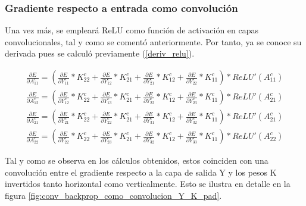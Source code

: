 \subsubsection{Gradiente respecto a entrada como convolución}

Una vez más, se empleará ReLU como función de activación en capas convolucionales, tal y como se comentó anteriormente. Por tanto, ya se conoce su derivada pues se calculó previamente (\ref{deriv_relu}).


\begin{gather}
	\frac{\partial E}{\partial A^c_{11}} = (\frac{\partial E}{\partial Y^c_{11}} * K^c_{22} + \frac{\partial E}{\partial Y^c_{12}} * K^c_{21} + \frac{\partial E}{\partial Y^c_{21}} * K^c_{12} + \frac{\partial E}{\partial Y^c_{22}} * K^c_{11}) *  ReLU'(A^c_{11}) \\
	\frac{\partial E}{\partial A^c_{12}} = (\frac{\partial E}{\partial Y^c_{12}} * K^c_{22} + \frac{\partial E}{\partial Y^c_{13}} * K^c_{21} + \frac{\partial E}{\partial Y^c_{22}} * K^c_{12} + \frac{\partial E}{\partial Y^c_{23}} * K^c_{11}) * ReLU'(A^c_{21}) \\
	\frac{\partial E}{\partial A^c_{21}} = (\frac{\partial E}{\partial Y^c_{21}} * K^c_{22} + \frac{\partial E}{\partial Y^c_{22}} * K^c_{21} + \frac{\partial E}{\partial Y^c_{31}} * K^c_{12} + \frac{\partial E}{\partial Y^c_{32}} * K^c_{11}) * ReLU'(A^c_{21}) \\
	\frac{\partial E}{\partial A^c_{22}} = (\frac{\partial E}{\partial Y^c_{22}} * K^c_{22} + \frac{\partial E}{\partial Y^c_{23}} * K^c_{21} + \frac{\partial E}{\partial Y^c_{32}} * K^c_{12} + \frac{\partial E}{\partial Y^c_{33}} * K^c_{11}) * ReLU'(A^c_{22})
\end{gather}

Tal y como se observa en los cálculos obtenidos, estos coinciden con una convolución entre el gradiente respecto a la capa de salida Y y los pesos K invertidos tanto horizontal como verticalmente. Esto se ilustra en detalle en la figura \ref{fig:conv_backprop_como_convolucion_Y_K_pad}.

